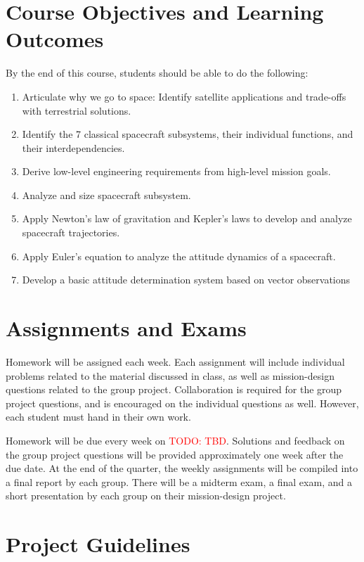 \documentclass[11pt,letterpaper]{article}
\newcommand{\todo}[1]{\textcolor{red}{TODO: #1}}
\begin{document}
\section*{Course Objectives and Learning Outcomes}
By the end of this course, students should be able to do the following:
\begin{enumerate}
	\item Articulate why we go to space: Identify satellite applications and trade-offs with terrestrial solutions.
	\item Identify the 7 classical spacecraft subsystems, their individual functions, and their interdependencies.
	\item Derive low-level engineering requirements from high-level mission goals.
	\item Analyze and size spacecraft subsystem.
	\item Apply Newton's law of gravitation and Kepler's laws to develop and analyze spacecraft trajectories.
	\item Apply Euler's equation to analyze the attitude dynamics of a spacecraft.
	\item Develop a basic attitude determination system based on vector observations
	
\end{enumerate}

\section*{Assignments and Exams}

Homework will be assigned each week. Each assignment will include individual problems related to the material discussed in class, as well as mission-design questions related to the group project. Collaboration is required for the group project questions, and is encouraged on the individual questions as well. However, each student must hand in their own work.

Homework will be due every week on \todo{TBD}. Solutions and feedback on the group project questions will be provided approximately one week after the due date. At the end of the quarter, the weekly assignments will be compiled into a final report by each group. There will be a midterm exam, a final exam, and a short presentation by each group on their mission-design project.

\section*{Project Guidelines}
\end{document}
